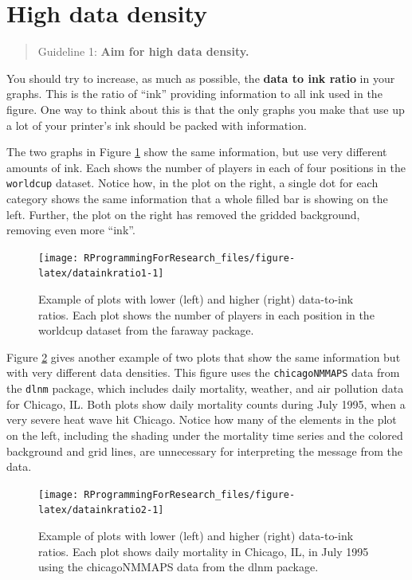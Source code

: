 \documentclass[]{book}
\begin{document}
\section{High data density}\label{high-data-density}

\begin{quote}
Guideline 1: \textbf{Aim for high data density.}
\end{quote}

You should try to increase, as much as possible, the \textbf{data to ink
ratio} in your graphs. This is the ratio of ``ink'' providing
information to all ink used in the figure. One way to think about this
is that the only graphs you make that use up a lot of your printer's ink
should be packed with information.

The two graphs in Figure \ref{fig:datainkratio1} show the same
information, but use very different amounts of ink. Each shows the
number of players in each of four positions in the \texttt{worldcup}
dataset. Notice how, in the plot on the right, a single dot for each
category shows the same information that a whole filled bar is showing
on the left. Further, the plot on the right has removed the gridded
background, removing even more ``ink''.

\begin{figure}

{\centering \texttt{[image: RProgrammingForResearch\_files/figure-latex/datainkratio1-1]} 

}

\caption{Example of plots with lower (left) and higher (right) data-to-ink ratios. Each plot shows the number of players in each position in the worldcup dataset from the faraway package.}\label{fig:datainkratio1}
\end{figure}

Figure \ref{fig:datainkratio2} gives another example of two plots that
show the same information but with very different data densities. This
figure uses the \texttt{chicagoNMMAPS} data from the \texttt{dlnm}
package, which includes daily mortality, weather, and air pollution data
for Chicago, IL. Both plots show daily mortality counts during July
1995, when a very severe heat wave hit Chicago. Notice how many of the
elements in the plot on the left, including the shading under the
mortality time series and the colored background and grid lines, are
unnecessary for interpreting the message from the data.

\begin{figure}

{\centering \texttt{[image: RProgrammingForResearch\_files/figure-latex/datainkratio2-1]} 

}

\caption{Example of plots with lower (left) and higher (right) data-to-ink ratios. Each plot shows daily mortality in Chicago, IL, in July 1995 using the chicagoNMMAPS data from the dlnm package.}\label{fig:datainkratio2}
\end{figure}
\end{document}
